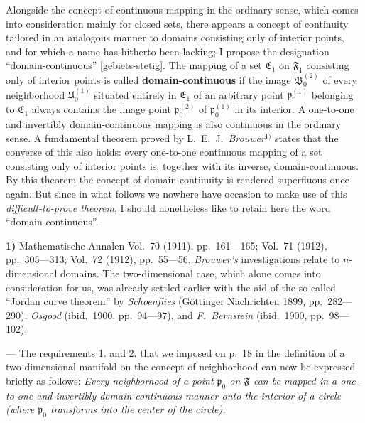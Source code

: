 \documentclass{article}
\begin{document}
Alongside the concept of continuous mapping in the ordinary sense, which comes into consideration mainly for closed sets, there appears a concept of continuity tailored in an analogous manner to domains consisting only of interior points, and for which a name has hitherto been lacking; I propose the designation ``domain-continuous'' [gebiets-stetig]. The mapping of a set $\mathfrak{E}_1$ on $\mathfrak{F}_1$ consisting only of interior points is called \textbf{domain-continuous} if the image $\mathfrak{B}_0^{(2)}$ of every neighborhood $\mathfrak{U}_0^{(1)}$ situated entirely in $\mathfrak{E}_1$ of an arbitrary point $\mathfrak{p}_0^{(1)}$ belonging to $\mathfrak{E}_1$ always contains the image point $\mathfrak{p}_0^{(2)}$ of $\mathfrak{p}_0^{(1)}$ in its interior. A one-to-one and invertibly domain-continuous mapping is also continuous in the ordinary sense. A fundamental theorem proved by L.~E.~J.~\emph{Brouwer}${}^{1)}$ states that the converse of this also holds: every one-to-one continuous mapping of a set consisting only of interior points is, together with its inverse, domain-continuous. By this theorem the concept of domain-continuity is rendered superfluous once again. But since in what follows we nowhere have occasion to make use of this \emph{difficult-to-prove theorem}, I should nonetheless like to retain here the word ``domain-continuous''.

\textbf{1)} Mathematische Annalen Vol.~70 (1911), pp.~161---165; Vol.~71 (1912), pp.~305---313; Vol.~72 (1912), pp.~55---56. \emph{Brouwer's} investigations relate to $n$-dimensional domains. The two-dimensional case, which alone comes into consideration for us, was already settled earlier with the aid of the so-called ``Jordan curve theorem'' by \emph{Schoenflies} (Göttinger Nachrichten 1899, pp.~282---290), \emph{Osgood} (ibid.\ 1900, pp.~94---97), and \emph{F.~Bernstein} (ibid.\ 1900, pp.~98---102).

--- The requirements 1. and 2. that we imposed on p.~18 in the definition of a two-dimensional manifold on the concept of neighborhood can now be expressed briefly as follows: \emph{Every neighborhood of a point $\mathfrak{p}_0$ on $\mathfrak{F}$ can be mapped in a one-to-one and invertibly domain-continuous manner onto the interior of a circle (where $\mathfrak{p}_0$ transforms into the center of the circle).}
\end{document}
